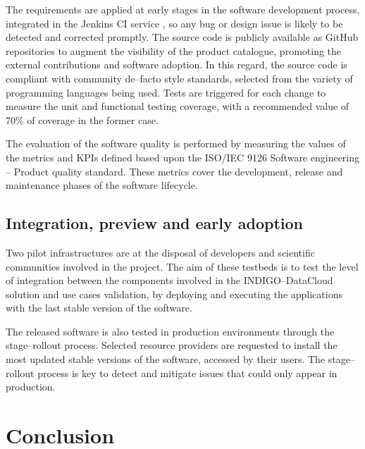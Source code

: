 \documentclass[journal]{IEEEtran}
\begin{document}
The requirements are applied at early stages in the software development process, integrated in the Jenkins CI service \cite{indigo-jenkins}, so any bug or design issue is likely to be detected and corrected promptly. The source code is publicly available as GitHub repositories \cite{indigo-github} to augment the visibility of the product catalogue, promoting the external contributions and software adoption. In this regard, the source code is compliant with community de--facto style standards, selected from the variety of programming languages being used. Tests are triggered for each change to measure the unit and functional testing coverage, with a recommended value of 70\% of coverage in the former case.


The evaluation of the software quality is performed by measuring the values of the metrics and KPIs defined based upon the ISO/IEC 9126 Software engineering -- Product quality standard. These metrics cover the development, release and maintenance phases of the software lifecycle.

\subsection{Integration, preview and early adoption}

Two pilot infrastructures are at the disposal of developers and scientific communities involved in the project. The aim of these testbeds is to test the level of integration between the components involved in the INDIGO--DataCloud solution and use cases validation, by deploying and executing the applications with the last stable version of the software.

The released software is also tested in production environments through the stage--rollout process. Selected resource providers are requested to install the most updated stable versions of the software, accessed by their users. The stage--rollout process is key to detect and mitigate issues that could only appear in production.

\section{Conclusion}
\end{document}
